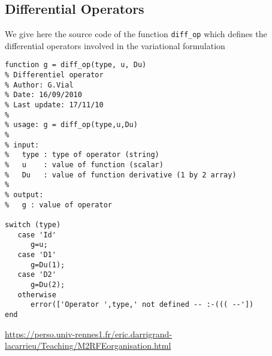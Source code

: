 \documentclass[11pt,a4paper,center,notitlepage]{article}
\numberwithin{equation}{section}
\begin{document}
\subsection{Differential Operators}\label{sec8.9}
We give here the source code of the function \verb|diff_op| which defines the differential operators involved in the variational formulation
\begin{verbatim}
function g = diff_op(type, u, Du)
% Differentiel operator
% Author: G.Vial
% Date: 16/09/2010
% Last update: 17/11/10
%
% usage: g = diff_op(type,u,Du)
%
% input:
% 	type : type of operator (string)
% 	u    : value of function (scalar)
% 	Du   : value of function derivative (1 by 2 array)
%
% output:
%	g : value of operator

switch (type)
   case 'Id'
      g=u;
   case 'D1'
      g=Du(1);
   case 'D2'
      g=Du(2);
   otherwise
      error(['Operator ',type,' not defined -- :-((( --'])
end
\end{verbatim}

\newpage
\begin{thebibliography}{999}
 \url{https://perso.univ-rennes1.fr/eric.darrigrand-lacarrieu/Teaching/M2RFEorganisation.html}
\end{thebibliography}





\printbibliography
\end{document}
